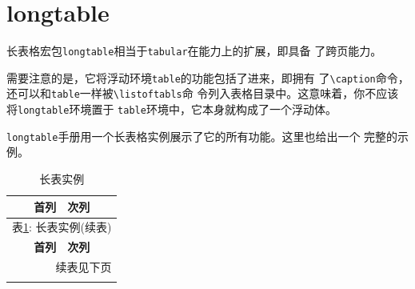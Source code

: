 \documentclass{article}
\begin{document}
\section{longtable}

长表格宏包\texttt{longtable}相当于\texttt{tabular}在能力上的扩展，即具备
了跨页能力。

需要注意的是，它将浮动环境\texttt{table}的功能包括了进来，即拥有
了\verb!\caption!命令，还可以和\texttt{table}一样被\verb!\listoftabls!命
令列入表格目录中。这意味着，你不应该将\texttt{longtable}环境置于
\texttt{table}环境中，它本身就构成了一个浮动体。

\texttt{longtable}手册用一个长表格实例展示了它的所有功能。这里也给出一个
完整的示例。

\begin{longtable}{@{*}r||p{2in}@{*}}

  \caption{长表实例}\label{tbl:longtable} \\
  \toprule
  首列    &  次列  \\
  \midrule
  \endfirsthead
  
  \multicolumn{2}{c}{表\ref{tbl:longtable}: 长表实例(续表)}\\%
  \toprule
  \textbf{首列}    &  \textbf{次列}  \\
  \midrule
  \endhead

  \midrule
  \multicolumn{2}{r}{续表见下页}\\%
  \endfoot
  
  \bottomrule
  \endlastfoot


\end{longtable}
\end{document}
